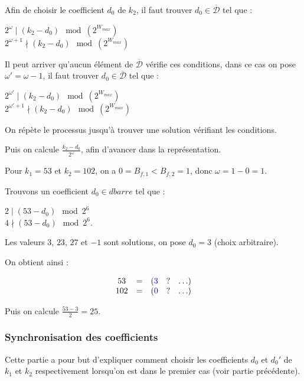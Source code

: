 \documentclass[12pt, a4paper]{memoir}
\newcommand{\dbarre}{\overline{\mathcal{D}}}
\begin{document}
   Afin de choisir le coefficient $d_0$ de $k_2$, il faut trouver $d_0 \in \dbarre$ tel que :
   \begin{center}
    $2^{\omega} \mid (k_2 - d_0) \mod (2^{W_{max}})$ \\
    $2^{\omega+1} \nmid (k_2 - d_0) \mod (2^{W_{max}})$
   \end{center}
 
 Il peut arriver qu'aucun élément de $\dbarre$ vérifie ces conditions, dans ce cas on pose $\omega' = \omega - 1$, 
 il faut trouver $d_0 \in \dbarre$ tel que :
 \begin{center}
    $2^{\omega'} \mid (k_2 - d_0) \mod (2^{W_{max}})$ \\
    $2^{\omega'+1} \nmid (k_2 - d_0) \mod (2^{W_{max}})$
 \end{center}
 
 On répète le processus jusqu'à trouver une solution vérifiant les conditions.
 
 Puis on calcule $\frac{k_2 - d_0}{2^{\omega}}$, afin d'avancer dans la représentation.
 
 \begin{Exemple}
  Pour $k_1 = 53$ et $k_2 = 102$, on a $0 = B_{f,1} < B_{f,2} = 1$, donc $\omega = 1 - 0 = 1$.
  
  Trouvons un coefficient $d_0 \in dbarre$ tel que :
  \begin{center}
   $2 \mid (53 - d_0) \mod 2^6$ \\
   $4 \nmid (53 - d_0) \mod 2^6$.
  \end{center}
  
  Les valeurs $3$, $23$, $27$ et $-1$ sont solutions, on pose $d_0 = 3$ (choix arbitraire).
  
  On obtient ainsi :
  
     $$\begin{array}{ccccc}
  53 & = & (\textcolor{blue}{3} & ? & \ldots) \\
  102 & = & (\textcolor{blue}{0} & ? & \ldots)
 \end{array}$$
 
 Puis on calcule $\frac{53 - 3}{2} = 25$.
 \end{Exemple}

  \subsubsection{Synchronisation des coefficients}
 
 Cette partie a pour but d'expliquer comment choisir les coefficients $d_0$ et $d_0'$ de $k_1$ et $k_2$ respectivement
 lorsqu'on est dans le premier cas (voir partie précédente).
 
\end{document}
